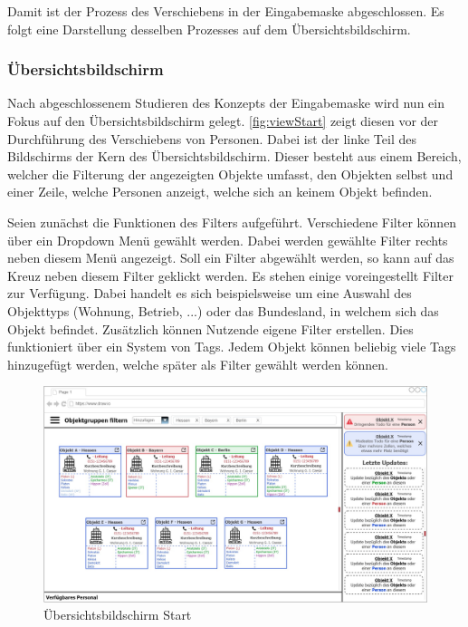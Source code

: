 Damit ist der Prozess des Verschiebens in der Eingabemaske abgeschlossen.
Es folgt eine Darstellung desselben Prozesses auf dem Übersichtsbildschirm.

\newpage
\subsubsection{Übersichtsbildschirm}

Nach abgeschlossenem Studieren des Konzepts der Eingabemaske wird nun ein Fokus auf den Übersichtsbildschirm gelegt.
\autoref{fig:viewStart} zeigt diesen vor der Durchführung des Verschiebens von Personen.
Dabei ist der linke Teil des Bildschirms der Kern des Übersichtsbildschirm.
Dieser besteht aus einem Bereich, welcher die Filterung der angezeigten Objekte umfasst, den Objekten selbst und einer Zeile, welche Personen anzeigt, welche sich an keinem Objekt befinden.

Seien zunächst die Funktionen des Filters aufgeführt.
Verschiedene Filter können über ein Dropdown Menü gewählt werden.
Dabei werden gewählte Filter rechts neben diesem Menü angezeigt.
Soll ein Filter abgewählt werden, so kann auf das Kreuz neben diesem Filter geklickt werden.
Es stehen einige voreingestellt Filter zur Verfügung.
Dabei handelt es sich beispielsweise um eine Auswahl des Objekttyps (Wohnung, Betrieb, ...) oder das Bundesland, in welchem sich das Objekt befindet.
Zusätzlich können Nutzende eigene Filter erstellen.
Dies funktioniert über ein System von Tags.
Jedem Objekt können beliebig viele Tags hinzugefügt werden, welche später als Filter gewählt werden können.

\begin{figure}[htp]
    \centering
    \includegraphics[width=\textwidth]{images/1-MockupsV1/ViewScreenLessBeforeMove.jpg}
    \caption{Übersichtsbildschirm Start}
    \label{fig:viewStart}
\end{figure}

